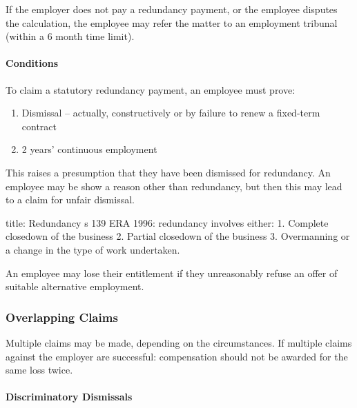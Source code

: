 \documentclass[
]{article}
\newenvironment{Shaded}{}{}
\newcommand{\NormalTok}[1]{#1}
\providecommand{\tightlist}{%
  \setlength{\itemsep}{0pt}\setlength{\parskip}{0pt}}
\begin{document}
If the employer does not pay a redundancy payment, or the employee
disputes the calculation, the employee may refer the matter to an
employment tribunal (within a 6 month time limit).

\hypertarget{conditions}{%
\paragraph{Conditions}\label{conditions}}

To claim a statutory redundancy payment, an employee must prove:

\begin{enumerate}
\def\labelenumi{\arabic{enumi}.}
\tightlist
\item
  Dismissal -- actually, constructively or by failure to renew a
  fixed-term contract
\item
  2 years' continuous employment
\end{enumerate}

This raises a presumption that they have been dismissed for redundancy.
An employee may be show a reason other than redundancy, but then this
may lead to a claim for unfair dismissal.

\begin{Shaded}
\begin{Highlighting}[]
\NormalTok{title: Redundancy}
\NormalTok{s 139 ERA 1996: redundancy involves either:}
\NormalTok{1. Complete closedown of the business}
\NormalTok{2. Partial closedown of the business}
\NormalTok{3. Overmanning or a change in the type of work undertaken.}
\end{Highlighting}
\end{Shaded}

An employee may lose their entitlement if they unreasonably refuse an
offer of suitable alternative employment.

\hypertarget{overlapping-claims}{%
\subsubsection{Overlapping Claims}\label{overlapping-claims}}

Multiple claims may be made, depending on the circumstances. If multiple
claims against the employer are successful: compensation should not be
awarded for the same loss twice.

\hypertarget{discriminatory-dismissals}{%
\paragraph{Discriminatory Dismissals}\label{discriminatory-dismissals}}
\end{document}
